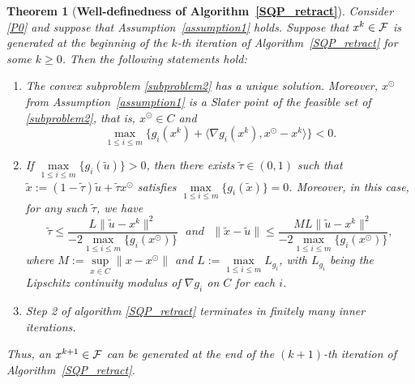 \documentclass[10pt]{article}
\numberwithin{equation}{section}
\newtheorem{theorem}{Theorem}[section]
\def\xfeas{x^\odot}
\begin{document}
\begin{theorem}[{{\bf Well-definedness of Algorithm~\ref{SQP_retract}}}]\label{welldef1}
Consider \eqref{P0} and suppose that Assumption~\ref{assumption1} holds. Suppose that $x^k\in {\cal F}$ is {\color{black} generated at the beginning of the $k$-th iteration} of Algorithm~\ref{SQP_retract} for some $k \ge 0$. Then the following statements hold:
\begin{enumerate}[{\rm (i)}]
   \item The convex subproblem \eqref{subproblem2} has a unique solution. Moreover, $\xfeas$ from Assumption~\ref{assumption1} is a Slater point of the feasible set of \eqref{subproblem2}, that is, $\xfeas\in C$ and $$\max\limits_{1 \le i \le m}\{g_i(x^k) + \langle \nabla g_i(x^k), \xfeas - x^k\rangle\} < 0.$$
   \item If $\max\limits_{1 \le i \le m} \{g_i(\widetilde{u})\} > 0$, then there exists $\widetilde{\tau}\in (0, 1)$ such that $\widetilde{x}:=(1 - \widetilde{\tau})\widetilde{u} + \widetilde{\tau} \xfeas$ satisfies $\max\limits_{1 \le i \le m} \{g_i(\widetilde{x})\} = 0$. Moreover, in this case, for any such $\widetilde\tau$, we have
       \begin{equation}\label{taubound0}
       \widetilde{\tau} \leq \frac{L\|\widetilde{u} - x^k\|^2}{-2\max\limits_{1 \le i \le m}\{g_i(\xfeas)\}}\ \ \ {and}\ \ \
       \|\widetilde{x} - \widetilde{u}\| \leq \frac{ML\|\widetilde{u} - x^k\|^2}{-2\max\limits_{1 \le i \le m}\{g_i(\xfeas)\}},
       \end{equation}
       where $M := \sup\limits_{x\in C}\|x - \xfeas\|$ and $L := \max\limits_{1 \le i \le m} L_{g_i}$, with $L_{g_i}$ being the Lipschitz continuity modulus of $\nabla g_i$ on $C$ for each $i$.
   \item Step 2 of algorithm \ref{SQP_retract} terminates in finitely many inner iterations.
 \end{enumerate}
 Thus, an $x^{k+1}\in {\cal F}$ can be generated at the end of the $(k+1)$-th iteration of Algorithm~\ref{SQP_retract}.
\end{theorem}
\end{document}
